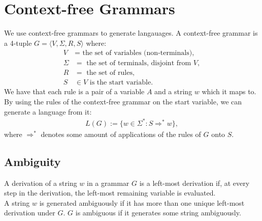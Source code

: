 \section{Context-free Grammars}

We use context-free grammars to generate langauages. A context-free grammar
is a 4-tuple $G = \langle V, \Sigma, R, S \rangle$ where: \begin{align*}
    V      &= \text{ the set of variables (non-terminals),}\\
    \Sigma &= \text{ the set of terminals, disjoint from } V, \\
    R      &= \text{ the set of rules},\\
    S      &\in V \text{ is the start variable}.
\end{align*} We have that each rule is a pair of a variable $A$ and a string $w$
which it maps to.
\\[\baselineskip]
By using the rules of the context-free grammar on the start variable, we can
generate a language from it: \begin{gather*}
    L(G) := \{w \in \Sigma^* : S \Rightarrow^* w \},
\end{gather*} where $\Rightarrow^*$ denotes some amount of applications
of the rules of $G$ onto $S$.

\subsection{Ambiguity}

A derivation of a string $w$ in a grammar $G$ is a
left-most derivation if, at every step in the derivation,
the left-most remaining variable is evaluated.
\\[\baselineskip]
A string $w$ is generated ambiguously if it has more than
one unique left-most derivation under $G$. $G$ is ambiguous
if it generates some string ambiguously.